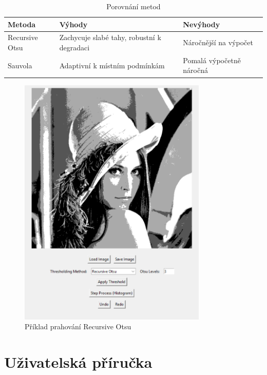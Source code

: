\documentclass[12pt,a4paper]{article}
\begin{document}
\begin{table}[h]
\centering
\caption{Porovnání metod}
\begin{tabular}{|l|l|l|}
\hline
Metoda & Výhody & Nevýhody \\
\hline
Recursive Otsu & Zachycuje slabé tahy, robustní k degradaci & Náročnější na výpočet \\
Sauvola & Adaptivní k místním podmínkám & Pomalá výpočetně náročná \\
\hline
\end{tabular}
\end{table}
\newpage
\begin{figure}[h]
\centering
\includegraphics[width=0.8\textwidth]{otsu.png}
\caption{Příklad prahování Recursive Otsu}
\label{fig:vysledky}
\end{figure}


\section{Uživatelská příručka}
\end{document}
